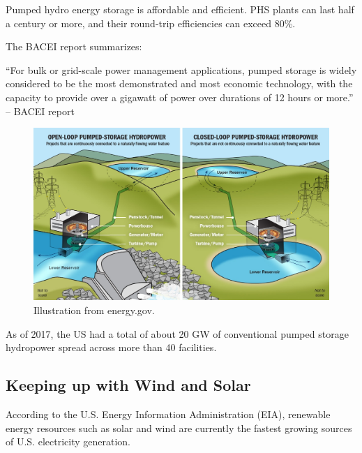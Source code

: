 \documentclass[hidelinks,12pt,a4paper]{article}
\begin{document}
Pumped hydro energy storage is affordable and efficient. PHS plants can last half a century or more, and their round-trip efficiencies can exceed 80\%. \cite{USGridEnergyStorageFactsheet}

The BACEI report summarizes:

\begin{displayquote}
“For bulk or grid-scale power management applications, pumped storage is widely considered to be the most demonstrated and most economic technology, with the capacity to provide over a gigawatt of power over durations of 12 hours or more.” \cite{EnergyStorageCaliforniaClimateandEnergyGoals} -- BACEI report
\end{displayquote}

\begin{figure}[ht!]
    \centering
    \includegraphics[width=1.00\textwidth]{111148-5000-wpto_pumped_storage_illustration_0.jpg}
    \caption{Illustration from energy.gov. \cite{EnergyGovPumpedStorageHydropower}}
\end{figure}
\FloatBarrier

As of 2017, the US had a total of about 20 GW of conventional pumped storage hydropower spread across more than 40 facilities. \cite{EnergyStorageCaliforniaClimateandEnergyGoals}

\subsection{Keeping up with Wind and Solar}
According to the U.S. Energy Information Administration (EIA), renewable energy resources such as solar and wind are currently the fastest growing sources of U.S. electricity generation. \cite{EIAForecastsRenewables}
\end{document}
